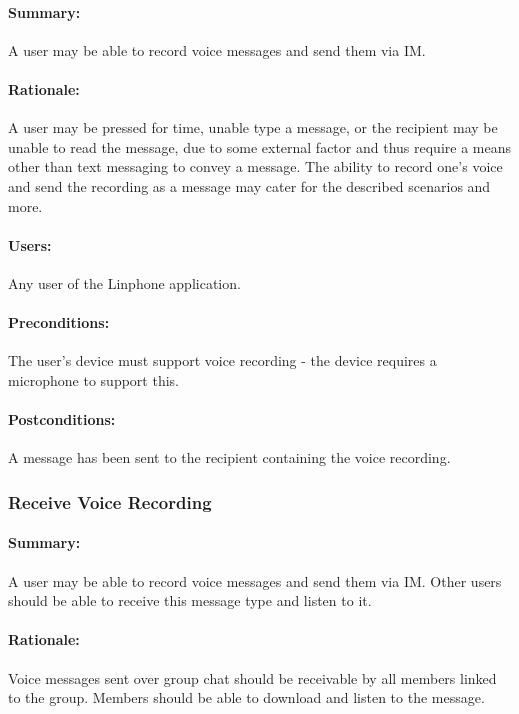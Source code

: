 \documentclass[11pt]{article}
\begin{document}
\paragraph{Summary:} A user may be able to record voice messages and send them via IM.
\paragraph{Rationale:} A user may be pressed for time, unable type a message, or the recipient may be unable to read the message, due to some external factor and thus require a means other than text messaging to convey a message. The ability to record one's voice and send the recording as a message may cater for the described scenarios and more.
\paragraph{Users:} Any user of the Linphone application.
\paragraph{Preconditions:} The user's device must support voice recording - the device requires a microphone to support this.
\paragraph{{Postconditions:}} A message has been sent to the recipient containing the voice recording.

\subsubsection{Receive Voice Recording} \label{UC-receive-voice}
\paragraph{Summary:} A user may be able to record voice messages and send them via IM. Other users should be able to receive this message type and listen to it.
\paragraph{Rationale:} Voice messages sent over group chat should be receivable by all members linked to the group. Members should be able to download and listen to the message.
\end{document}
